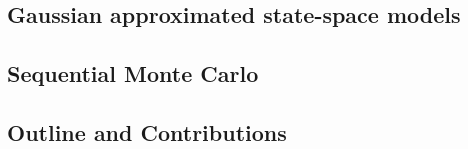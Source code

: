 

\subsection{Gaussian approximated state-space models}
\label{subsec:kalman-intro}


\subsection{Sequential Monte Carlo}
\label{subsec:smc-intro}


\subsection{Outline and Contributions}
\label{subsec:contribs-intro}

